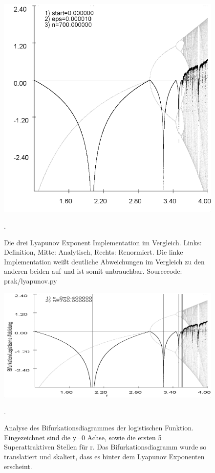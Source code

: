 \documentclass{scrartcl}
\begin{document}
\begin{figure}
\includegraphics[scale=0.28]{iteration/lyapunov-3}
\caption{Die drei Lyapunov Exponent Implementation im Vergleich. Links: Definition, Mitte: Analytisch, Rechts: Renormiert. Die linke Implementation weißt deutliche Abweichungen im Vergleich zu den anderen beiden auf und ist somit unbrauchbar. Sourcecode: prak/lyapunov.py}. 
\end{figure}
\begin{figure}
\centering
\includegraphics[scale=0.45]{iteration/bifurk-log-lyapunov-periode}
\caption{Analyse des Bifurkationsdiagrammes der logistischen Funktion. Eingezeichnet sind die y=0 Achse, sowie die ersten 5 Superattraktiven Stellen für r. Das Bifurkationsdiagramm wurde so translatiert und skaliert, dass es hinter dem Lyapunov Exponenten erscheint.}. 
\end{figure}
\end{document}
